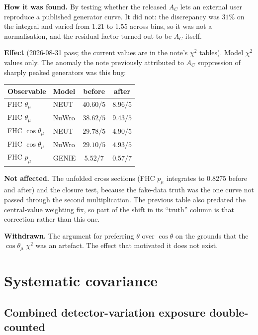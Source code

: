 \textbf{How it was found.}  By testing whether the released $A_C$ lets an external user
reproduce a published generator curve. It did not: the discrepancy was $31\%$ on the
integral and varied from $1.21$ to $1.55$ across bins, so it was not a normalisation, and
the residual factor turned out to be $A_C$ itself.

\textbf{Effect} (2026-08-31 pass; the current values are in the note's
$\chi^2$ tables).  Model $\chi^2$ values only.  The anomaly the note previously attributed
to $A_C$ suppression of sharply peaked generators was this bug:

\begin{center}
\small
\begin{tabular}{llcc}
\toprule
Observable & Model & before & after \\
\midrule
FHC $\theta_\mu$      & NEUT  & $40.60/5$ & $8.96/5$ \\
FHC $\theta_\mu$      & NuWro & $38.62/5$ & $9.43/5$ \\
FHC $\cos\theta_\mu$  & NEUT  & $29.78/5$ & $4.90/5$ \\
FHC $\cos\theta_\mu$  & NuWro & $29.10/5$ & $4.93/5$ \\
FHC $p_\mu$           & GENIE & $5.52/7$  & $0.57/7$ \\
\bottomrule
\end{tabular}
\end{center}

\textbf{Not affected.}  The unfolded cross sections (FHC $p_\mu$ integrates to $0.8275$
before and after) and the closure test, because the fake-data truth was the one curve not
passed through the second multiplication.  The previous table also predated the
central-value weighting fix, so part of the shift in its ``truth'' column is that
correction rather than this one.

\textbf{Withdrawn.}  The argument for preferring $\theta$ over $\cos\theta$ on the grounds
that the $\cos\theta_\mu$ $\chi^2$ was an artefact.  The effect that motivated it does not
exist.

\section{Systematic covariance}

\subsection{Combined detector-variation exposure double-counted}

